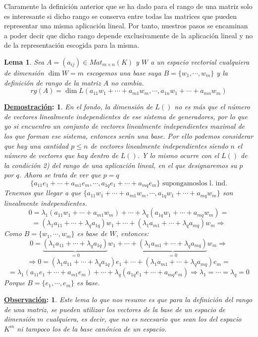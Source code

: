 \documentclass[10pt,a4paper,openright]{book}
\theoremstyle{break}
\newtheorem*{lema}{Lema}
\newtheorem*{demo}{\underline{Demostración}:}
\newtheorem*{obs}{\underline{Observación}:}
\begin{document}
Claramente la definición anterior que se ha dado para el rango de una matriz solo es interesante si dicho rango se conserva entre todas las matrices que pueden representar una misma aplicación lineal. Por tanto, nuestros pasos se encaminan a poder decir que dicho rango depende exclusivamente de la aplicación lineal y no de la representación escogida para la misma.

\begin{lema}
Sea $A=(a_{ij})\in Mat_{m\times n}(K)$ y $W$ a un espacio vectorial cualquiera de dimensión $\dim W=m$ escogemos una base suya $B=\{w_1, \cdots, w_m\}$ y la definición de rango de la matriz $A$ no cambia.
$$rg(A)=\dim L(a_{11}w_{1}+\cdots+a_{m1}w_m, \cdots, a_{1n}w_1+\cdots+a_{mn}w_m)$$
\end{lema}
\begin{demo}
En el fondo, la dimensión de $L()$ no es más que el número de vectores linealmente independientes de ese sistema de generadores, por lo que yo si encuentro un conjunto de vectores linealmente independientes maximal de los que forman ese sistema, entonces serán una base. Por ello podemos considerar que hay una cantidad $p\leq n$ de vectores linealmente independientes siendo $n$ el número de vectores que hay dentro de $L()$.  Y lo mismo ocurre con el $L()$ de la condición 2) del rango de una aplicación lineal, en el que designaremos su $p$ por $q$. Ahora se trata de ver que $p=q$
$$\{a_{11}e_{1}+\cdots+a_{m1}e_m, \cdots, a_{1q}e_1+\cdots+a_{mq}e_m\}\mbox{ supongamoslos l. ind.}$$
Tenemos que llegar a que $\{a_{11}w_1+\cdots+a_{m1}w_m,\cdots,a_{1q}w_1+\cdots+a_{mq}w_m\}$ son linealmente independientes.
$$0=\lambda_1(a_{11}w_1+\cdots+a_{m1}w_m)+\cdots+\lambda_q(a_{1q}w_1+\cdots+a_{mq}w_m)=$$
$$=(\lambda_1a_{11}+\cdots+\lambda_qa_{1q})w_1+\cdots+(\lambda_1a_{m1}+\cdots+\lambda_qa_{mq})w_m\Rightarrow $$
Como $B=\{w_1, \cdots, w_m\}$ es base de $W$, entonces:
$$0=\underbrace{(\lambda_1a_{11}+\cdots+\lambda_qa_{1q})}_{=0}w_1+\cdots+\underbrace{(\lambda_1a_{m1}+\cdots+\lambda_qa_{mq})}_{=0}w_m\Rightarrow$$
$$\Rightarrow  0=(\lambda_1a_{11}+\cdots+\lambda_qa_{1q})e_1+\cdots+(\lambda_1a_{m1}+\cdots+\lambda_qa_{mq})e_m=$$
$$=\lambda_1(a_{11}e_1+\cdots+a_{m1}e_m)+\cdots+\lambda_q(a_{1q}e_1+\cdots+a_{mq}e_m)\Rightarrow \lambda_1=\cdots=\lambda_q=0$$
Porque $B=\{e_1, \cdots, e_m \}$ es base.
\end{demo}

\begin{obs}
Este lema lo que nos resume es que para la definición del rango de una matriz, se pueden utilizar los vectores de la base de un espacio de dimensión $m$ cualquiera, es decir, que no es necesario que sean los del espacio $K^m$ ni tampoco los de la base canónica de un espacio.
\end{obs}
\end{document}
